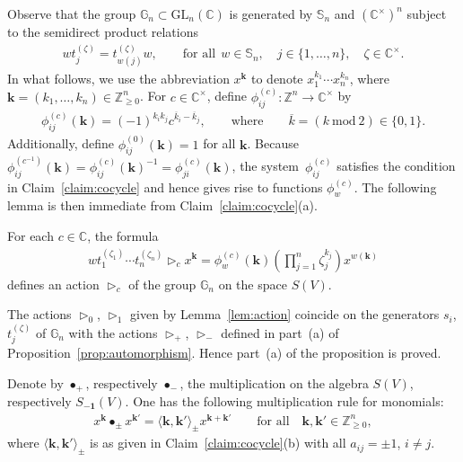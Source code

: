 Observe that the group $\mathbb G_n\subset \mathrm{GL}_n(\mathbb C)$ is generated by $\mathbb S_n$ and $(\mathbb
C^\times)^n$ subject to the semidirect product relations
\begin{gather*}
wt_j^{(\zeta)}=t_{w(j)}^{(\zeta)} w,
\qquad
\text{for all} \ \ w\in \mathbb S_n,
\quad
j\in\{1,\ldots,n\},
\quad
\zeta\in\mathbb C^\times.
\end{gather*}
In what follows, we use the abbreviation $x^{\mathbf k}$ to denote $x_1^{k_1}\cdots x_n^{k_n}$, where $\mathbf
k=(k_1,\ldots,k_n)\in \mathbb Z_{\ge 0}^n$.
For $c\in \mathbb C^\times$, def\/ine $\phi_{ij}^{(c)}\colon \mathbb Z^n\to \mathbb C^\times$ by
\begin{gather*}
\phi_{ij}^{(c)}(\mathbf k) = (-1)^{k_ik_j} c^{\overline k_i-\overline k_j},
\qquad
\text{where}
\qquad
\overline k=(k\ \mathrm{mod}\ 2)\in\{0,1\}.
\end{gather*}
Additionally, def\/ine $\phi_{ij}^{(0)}(\mathbf k)=1$ for all $\mathbf k$.
Because $\phi_{ij}^{(c^{-1})}(\mathbf k)=\phi_{ij}^{(c)}(\mathbf k)^{-1}=\phi_{ji}^{(c)}(\mathbf k)$, the system~$\phi_{ij}^{(c)}$ satisf\/ies the condition in Claim~\ref{claim:cocycle} and hence gives rise to functions
$\phi_w^{(c)}$.
The following lemma is then immediate from Claim~\ref{claim:cocycle}(a).

\begin{Lemma}
\label{lem:action}
For each $c\in\mathbb C$, the formula
\begin{gather*}
w t_1^{(\zeta_1)}\cdots t_n^{(\zeta_n)} \mathop{\triangleright}\nolimits_c x^{\mathbf k} = \phi^{(c)}_w(\mathbf k)
\left(\prod\limits_{j=1}^n \zeta_j^{k_j}\right) x^{w(\mathbf k)}
\end{gather*}
defines an action $\mathop{\triangleright}\nolimits_c$ of the group $\mathbb G_n$ on the space $S(V)$.
\end{Lemma}

The actions $\mathop{\triangleright}\nolimits_0$, $\mathop{\triangleright}\nolimits_1$ given by Lemma~\ref{lem:action}
coincide on the generators $s_i$, $t_j^{(\zeta)}$ of $\mathbb G_n$ with the actions
$\mathop{\triangleright}\nolimits_+$, $\mathop{\triangleright}\nolimits_-$ def\/ined in part~(a) of
Proposition~\ref{prop:automorphism}.
Hence part~(a) of the proposition is proved.



Denote by $\bullet_+$, respectively $\bullet_-$, the multiplication on the algebra $S(V)$, respectively
$S_{\mathbf{-1}}(V)$.
One has the following multiplication rule for monomials:
\begin{gather*}
x^{\mathbf k}\bullet_\pm x^{\mathbf{k'}} = \langle \mathbf k,\mathbf k'\rangle_\pm x^{\mathbf{k}+\mathbf{k'}}
\qquad
\text{for all}\quad\mathbf{k}, \mathbf{k'}\in \mathbb Z_{\ge 0}^n,
\end{gather*}
where $\langle \mathbf k,\mathbf k'\rangle_\pm$ is as given in Claim~\ref{claim:cocycle}(b) with all $a_{ij}=\pm1$, $i\ne j$.

